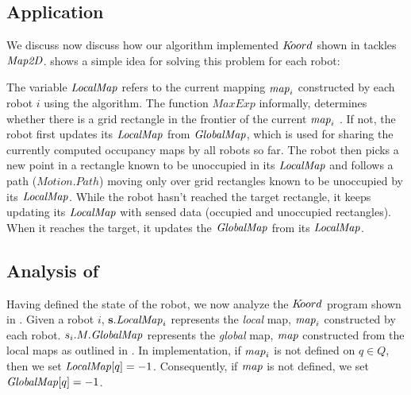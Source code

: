 \subsection{\dmap Application}





We discuss now discuss how our algorithm implemented $K\kern-2pt oord$ shown in  tackles $\mathit{Map2D}$.  shows a simple idea for solving this problem for each robot:

The variable $\mathit{LocalMap}$ refers to the current mapping $\mathit{map}_i$ constructed by each robot $i$ using the algorithm. The function $\mathit{MaxExp}$ informally, determines whether there is a grid rectangle in the frontier of the current $\mathit{map}_i$ . If not, the robot first updates its $\mathit{LocalMap}$ from $\mathit{GlobalMap}$, which is used for sharing the currently computed occupancy maps by all robots so far. The robot then picks a new point in a rectangle known to be unoccupied in its $\mathit{LocalMap}$ and follows a path ($\mathit{Motion.Path}$) moving only over grid rectangles known to be unoccupied by its $\mathit{LocalMap}$. While the robot hasn't reached the target rectangle, it keeps updating its $\mathit{LocalMap}$ with sensed data (occupied and unoccupied rectangles). When it reaches the target, it updates the $\mathit{GlobalMap}$ from its $\mathit{LocalMap}$.



\subsection{Analysis of \dmap}
\label{sec:analysis}



Having defined the state of the robot, we now analyze the $K\kern-2pt oord$ program shown in . Given a robot $i$, ${\bf s}.\mathit{LocalMap}_i$ represents the \emph{local} map, $\mathit{map}_i$ constructed by each robot. $s_i.M.\mathit{GlobalMap}$ represents the \emph{global} map, $\mathit{map}$ constructed from the local maps as outlined in . In implementation, if $\mathit{map}_i$ is not defined on $q\in Q$, then we set $\mathit{LocalMap}[q] = -1$. Consequently, if $\mathit{map}$ is not defined, we set $\mathit{GlobalMap}[q] = -1$.


